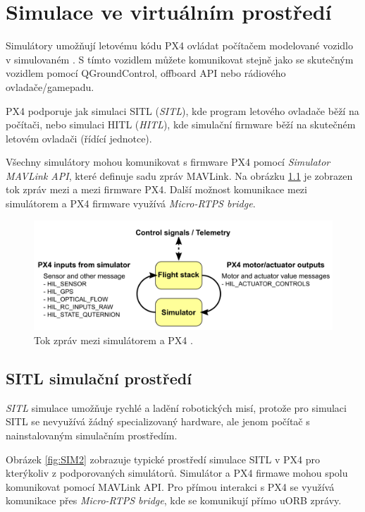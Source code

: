 \chapter{Simulace ve virtuálním prostředí}

Simulátory umožňují letovému kódu PX4 ovládat počítačem modelované vozidlo v simulovaném . S tímto vozidlem můžete komunikovat stejně jako se skutečným vozidlem pomocí QGroundControl, offboard API nebo rádiového ovladače/gamepadu. 

PX4 podporuje jak simulaci \acs{SITL} (\textit{\acl{SITL}}), kde program letového ovladače běží na počítači, nebo simulaci \acs{HITL} (\textit{\acl{HITL}}), kde simulační firmware běží na skutečném letovém ovladači (řídící jednotce). \cite{SIM}

Všechny simulátory mohou komunikovat s firmware PX4 pomocí \textit{Simulator MAVLink API}, které definuje sadu zpráv MAVLink. Na obrázku \ref{fig:SIM1} je zobrazen tok zpráv mezi  a mezi firmware PX4. Další možnost komunikace mezi simulátorem a PX4 firmware využívá \textit{Micro-RTPS bridge}.

\begin{figure}[!ht]
  \begin{center}
    \includegraphics[scale=0.29]{obrazky/SIM1}
  \end{center}
  \caption[Tok zpráv mezi simulátorem a PX4]{Tok zpráv mezi simulátorem a PX4 \cite{SIM}.}
  \label{fig:SIM1}
\end{figure}

\section{SITL simulační prostředí}

\textit{\acl{SITL}} simulace umožňuje rychlé a  ladění robotických misí, protože pro simulaci \acs{SITL} se nevyužívá žádný specializovaný hardware, ale jenom počítač s nainstalovaným simulačním prostředím.

Obrázek \ref{fig:SIM2} zobrazuje typické prostředí simulace SITL v PX4 pro kterýkoliv z podporovaných simulátorů. Simulátor a PX4 firmawe mohou spolu komunikovat pomocí MAVLink \acs{API}. Pro přímou interakci s PX4 se využívá komunikace přes \textit{Micro-RTPS bridge}, kde se komunikují přímo uORB zprávy.

